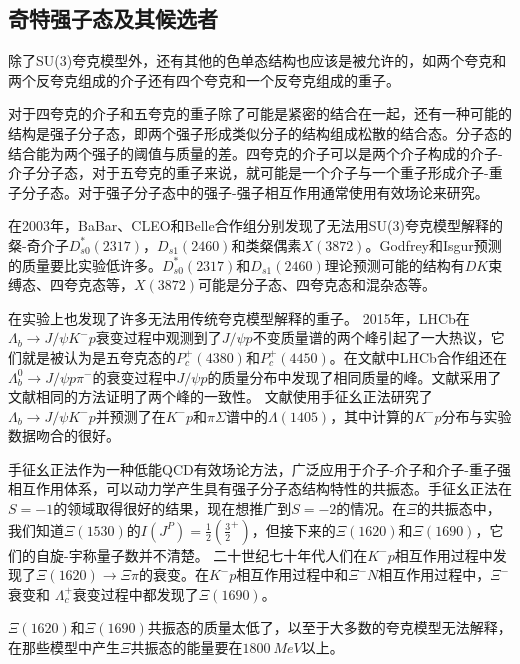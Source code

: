 \subsection{奇特强子态及其候选者}
除了SU(3)夸克模型外，还有其他的色单态结构也应该是被允许的，如两个夸克和两个反夸克组成的介子还有四个夸克和一个反夸克组成的重子。\par
对于四夸克的介子和五夸克的重子除了可能是紧密的结合在一起，还有一种可能的结构是强子分子态，即两个强子形成类似分子的结构组成松散的结合态。分子态的结合能为两个强子的阈值与质量的差。四夸克的介子可以是两个介子构成的介子-介子分子态，对于五夸克的重子来说，就可能是一个介子与一个重子形成介子-重子分子态。对于强子分子态中的强子-强子相互作用通常使用有效场论来研究。\par
在2003年，BaBar、CLEO和Belle合作组分别发现了无法用SU(3)夸克模型解释的粲-奇介子$D^{*}_{s0}(2317)$，$D_{s1}(2460)$和类粲偶素$X(3872)$。Godfrey和Isgur预测的质量要比实验低许多\cite{godfrey1985mesons}。$D^{*}_{s0}(2317)$和$D_{s1}(2460)$理论预测可能的结构有$DK$束缚态、四夸克态等，$X(3872)$可能是分子态、四夸克态和混杂态等。\par
在实验上也发现了许多无法用传统夸克模型解释的重子。
2015年，LHCb在$\Lambda_b\rightarrow J/\psi K^-p$衰变过程中观测到了$J/\psi p$不变质量谱的两个峰引起了一大热议，它们就是被认为是五夸克态的$P_{c}^{+}(4380)$和$P_{c}^{+}(4450)$\cite{PhysRevLett.115.072001,Aaij_2016}。在文献\cite{Aaij2014}中LHCb合作组还在$\Lambda_{b}^{0}\to J/\psi p\pi^{-}$的衰变过程中$J/\psi p$的质量分布中发现了相同质量的峰。文献\cite{PhysRevD.93.094001}采用了文献\cite{PhysRevD.92.094003}相同的方法证明了两个峰的一致性。
文献\cite{Roca2015}使用手征幺正法研究了$\Lambda_b\rightarrow J/\psi K^-p$并预测了在$K^{-}p$和$\pi\Sigma$谱中的$\Lambda(1405)$\cite{Dalitz2000}，其中计算的$K^{-}p$分布与实验数据吻合的很好。\par
手征幺正法作为一种低能QCD有效场论方法，广泛应用于介子-介子和介子-重子强相互作用体系，可以动力学产生具有强子分子态结构特性的共振态。手征幺正法在$S=-1$的领域取得很好的结果，现在想推广到$S=-2$的情况。在$\Xi$的共振态中，我们知道$\Xi(1530)$的$I(J^{P})=\frac{1}{2}(\frac{3}{2}^{+})$，但接下来的$\Xi(1620)$和$\Xi(1690)$，它们的自旋-宇称量子数并不清楚。
二十世纪七十年代人们在$K^{-}p$相互作用过程中发现了$\Xi(1620)\to\Xi\pi$的衰变\cite{deBellefon1975,PhysRevD.16.2706,ROSS1972177}。在$K^{-}p$相互作用过程中和$\Xi^{-}N$相互作用过程中，$\Xi^{-}$衰变和 $\Lambda_{c}^{+}$衰变过程中都发现了$\Xi(1690)$\cite{DIONISI1978145,Biagi1981,Biagi1987,ABE200233}。\par
$\Xi(1620)$和$\Xi(1690)$共振态的质量太低了，以至于大多数的夸克模型无法解释，在那些模型中产生$\Xi$共振态的能量要在$\SI{1800}{MeV}$以上\cite{PhysRevD.34.2809,Blask:1990ez}。
